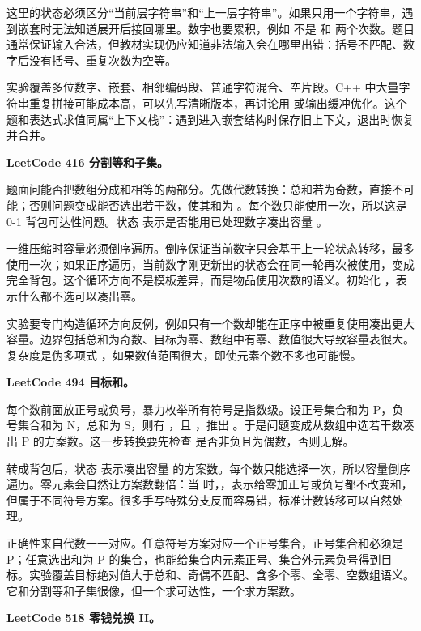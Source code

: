 这里的状态必须区分“当前层字符串”和“上一层字符串”。如果只用一个字符串，遇到嵌套时无法知道展开后接回哪里。数字也要累积，例如  不是  和  两个次数。题目通常保证输入合法，但教材实现仍应知道非法输入会在哪里出错：括号不匹配、数字后没有括号、重复次数为空等。

实验覆盖多位数字、嵌套、相邻编码段、普通字符混合、空片段。C++ 中大量字符串重复拼接可能成本高，可以先写清晰版本，再讨论用  或输出缓冲优化。这个题和表达式求值同属“上下文栈”：遇到进入嵌套结构时保存旧上下文，退出时恢复并合并。

\noindent\textbf{LeetCode 416 分割等和子集。}

题面问能否把数组分成和相等的两部分。先做代数转换：总和若为奇数，直接不可能；否则问题变成能否选出若干数，使其和为 。每个数只能使用一次，所以这是 0-1 背包可达性问题。状态  表示是否能用已处理数字凑出容量 。

一维压缩时容量必须倒序遍历。倒序保证当前数字只会基于上一轮状态转移，最多使用一次；如果正序遍历，当前数字刚更新出的状态会在同一轮再次被使用，变成完全背包。这个循环方向不是模板差异，而是物品使用次数的语义。初始化 ，表示什么都不选可以凑出零。

实验要专门构造循环方向反例，例如只有一个数却能在正序中被重复使用凑出更大容量。边界包括总和为奇数、目标为零、数组中有零、数值很大导致容量表很大。复杂度是伪多项式 ，如果数值范围很大，即使元素个数不多也可能慢。

\noindent\textbf{LeetCode 494 目标和。}

每个数前面放正号或负号，暴力枚举所有符号是指数级。设正号集合和为 P，负号集合和为 N，总和为 S，则有 ，且 ，推出 。于是问题变成从数组中选若干数凑出 P 的方案数。这一步转换要先检查  是否非负且为偶数，否则无解。

转成背包后，状态  表示凑出容量  的方案数。每个数只能选择一次，所以容量倒序遍历。零元素会自然让方案数翻倍：当  时，，表示给零加正号或负号都不改变和，但属于不同符号方案。很多手写特殊分支反而容易错，标准计数转移可以自然处理。

正确性来自代数一一对应。任意符号方案对应一个正号集合，正号集合和必须是 P；任意选出和为 P 的集合，也能给集合内元素正号、集合外元素负号得到目标。实验覆盖目标绝对值大于总和、奇偶不匹配、含多个零、全零、空数组语义。它和分割等和子集很像，但一个求可达性，一个求方案数。

\noindent\textbf{LeetCode 518 零钱兑换 II。}

